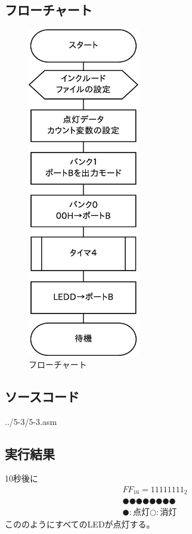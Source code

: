 \documentclass[a4paper,12pt]{ujarticle}
\begin{document}
 \subsection{フローチャート}
 \begin{figure}[htbp]
    \begin{center}
     \includegraphics[height=145mm]{Diagram5-3.eps}
    \end{center}
    \caption{フローチャート}
    \label{fig}
 \end{figure}
 \clearpage
 \subsection{ソースコード}
  \begin{lstinputlisting}[basicstyle=\ttfamily\footnotesize, frame=single]
   {../5-3/5-3.asm}
  \end{lstinputlisting}
  \subsection{実行結果}
  10秒後に
  \begin{eqnarray*}
   {FF}_{16} = 11111111_2 \\
   ●●●●●●●● \\
   ●:点灯○:消灯
  \end{eqnarray*}
  こののようにすべてのLEDが点灯する。
\end{document}
